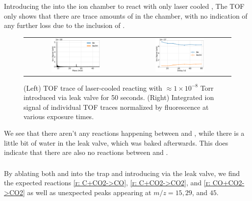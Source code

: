 \subsubsection{}
Introducing the  into the ion chamber to react with only laser cooled , The TOF only shows that there are trace amounts of  in the chamber, with no indication of any further loss due to the inclusion of .

\begin{figure}[H]
	\label{fig: be + co2 tof traces}
	\centering
	\begin{tabular}{cc}
	\includegraphics[width=0.5\textwidth]{images/be_CO2_tof.png}
	&
	\includegraphics[width=0.5\textwidth]{images/be_CO2_traces.png}
	\end{tabular}
	\caption{(Left) TOF trace of laser-cooled  reacting with $\approx 1 \times 10^{-8}$ Torr  introduced via leak valve for 50 seconds. (Right) Integrated ion signal of individual TOF traces normalized by  fluorescence at various  exposure times.}
\end{figure}

We see that there aren't any reactions happening between  and , while there is a little bit of water in the leak valve, which was baked afterwards. This does indicate that there are also no reactions between  and .

\subsubsection{}
By ablating both  and  into the trap and introducing  via the leak valve, we find the expected reactions \ref{r: C+CO2->CO}, \ref{r: C+CO2->CO2}, and \ref{r: CO+CO2->CO2} as well as unexpected peaks appearing at $m/z=15, 29$, and $45$.

